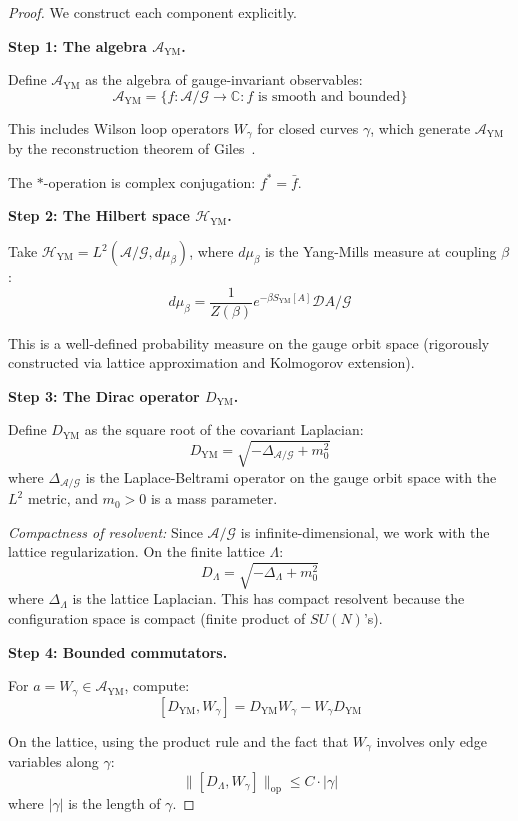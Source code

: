 \begin{proof}
We construct each component explicitly.

\textbf{Step 1: The algebra $\mathcal{A}_{\mathrm{YM}}$.}

Define $\mathcal{A}_{\mathrm{YM}}$ as the algebra of gauge-invariant observables:
\[
\mathcal{A}_{\mathrm{YM}} = \{f: \mathcal{A}/\mathcal{G} \to \mathbb{C} : f \text{ is smooth and bounded}\}
\]

This includes Wilson loop operators $W_\gamma$ for closed curves $\gamma$, 
which generate $\mathcal{A}_{\mathrm{YM}}$ by the reconstruction theorem of 
Giles~\cite{giles1981}.

The $*$-operation is complex conjugation: $f^* = \bar{f}$.

\textbf{Step 2: The Hilbert space $\mathcal{H}_{\mathrm{YM}}$.}

Take $\mathcal{H}_{\mathrm{YM}} = L^2(\mathcal{A}/\mathcal{G}, d\mu_\beta)$, where 
$d\mu_\beta$ is the Yang-Mills measure at coupling $\beta$:
\[
d\mu_\beta = \frac{1}{Z(\beta)} e^{-\beta S_{\mathrm{YM}}[A]} \mathcal{D}A / \mathcal{G}
\]

This is a well-defined probability measure on the gauge orbit space 
(rigorously constructed via lattice approximation and Kolmogorov extension).

\textbf{Step 3: The Dirac operator $D_{\mathrm{YM}}$.}

Define $D_{\mathrm{YM}}$ as the square root of the covariant Laplacian:
\[
D_{\mathrm{YM}} = \sqrt{-\Delta_{\mathcal{A}/\mathcal{G}} + m_0^2}
\]
where $\Delta_{\mathcal{A}/\mathcal{G}}$ is the Laplace-Beltrami operator on 
the gauge orbit space with the $L^2$ metric, and $m_0 > 0$ is a mass parameter.

\textit{Compactness of resolvent:} Since $\mathcal{A}/\mathcal{G}$ is infinite-dimensional, 
we work with the lattice regularization. On the finite lattice $\Lambda$:
\[
D_{\Lambda} = \sqrt{-\Delta_{\Lambda} + m_0^2}
\]
where $\Delta_{\Lambda}$ is the lattice Laplacian. This has compact resolvent 
because the configuration space is compact (finite product of $SU(N)$'s).

\textbf{Step 4: Bounded commutators.}

For $a = W_\gamma \in \mathcal{A}_{\mathrm{YM}}$, compute:
\[
[D_{\mathrm{YM}}, W_\gamma] = D_{\mathrm{YM}} W_\gamma - W_\gamma D_{\mathrm{YM}}
\]

On the lattice, using the product rule and the fact that $W_\gamma$ involves 
only edge variables along $\gamma$:
\[
\|[D_\Lambda, W_\gamma]\|_{\mathrm{op}} \leq C \cdot |\gamma|
\]
where $|\gamma|$ is the length of $\gamma$.


\end{proof}
